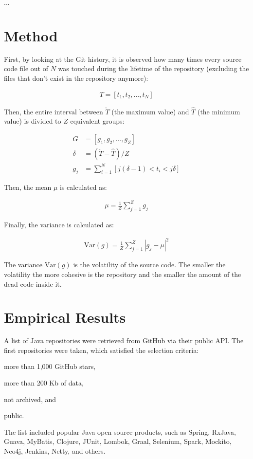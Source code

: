 \documentclass[12pt]{article}
\begin{document}
...

\section{Method}
\label{sec:method}

First, by looking at the Git history,
it is observed how many times every source code file out of $N$ was touched
during the lifetime of the repository (excluding the files that don't exist
in the repository anymore):

\begin{eqnarray}
T = [t_1, t_2, \dots, t_N]
\end{eqnarray}

Then, the entire interval between $\check{T}$ (the maximum value)
and $\hat{T}$ (the minimum value) is divided to $Z$ equivalent groups:

\begin{align}
G &= [g_1, g_2, \dots, g_{Z}] \\
\delta &= ( \check{T} - \hat{T} ) / Z \\
g_j &= \sum_{i=1}^N [ j(\delta-1) < t_i < j\delta ]
\end{align}

Then, the mean $\mu$ is calculated as:

\begin{eqnarray}
\mu = \frac{1}{Z}\sum_{j=1}^{Z}{g_j}
\end{eqnarray}

Finally, the variance is calculated as:

\begin{eqnarray}
\text{Var}(g) = \frac{1}{Z}\sum_{j=1}^{Z}{|g_j - \mu|^2}
\end{eqnarray}

The variance $\text{Var}(g)$ is the volatility of the source code. The smaller
the volatility the more cohesive is the repository and the smaller
the amount of the dead code inside it.

\section{Empirical Results}

A list of Java repositories were retrieved from GitHub via their
public API. The first \thetotalrepos{} repositories were taken, which satisfied
the selection criteria:
\begin{enumerate*}[label={\arabic*)}]
\item more than 1,000 GitHub stars,
\item more than 200 Kb of data,
\item not archived, and
\item public.
\end{enumerate*}
The list included popular Java open source products, such as
Spring, RxJava, Guava, MyBatis, Clojure, JUnit, Lombok,
Graal, Selenium, Spark, Mockito, Neo4j, Jenkins, Netty, and others.
\end{document}
